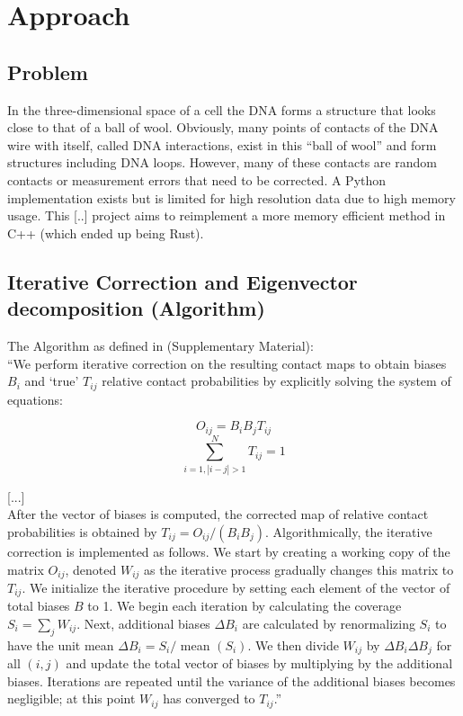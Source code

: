 \chapter{Approach}\label{chap:approach}



\section{Problem}\label{sec:problem}

In the three-dimensional space of a cell the DNA forms a structure that looks
close to that of a ball of wool. Obviously, many points of contacts of the DNA
wire with itself, called DNA interactions, exist in this ``ball of wool'' and
form structures including DNA loops. However, many of these contacts are
random contacts or measurement errors that need to be corrected. A Python
implementation exists but is limited for high resolution data due to high
memory usage. This [..] project aims to reimplement a more memory efficient
method in C++ (which ended up being Rust).



\section{Iterative Correction and Eigenvector decomposition (Algorithm)}\label{sec:ICE}

The Algorithm as defined in \cite{imakaev2012iterative} (Supplementary Material): \\
``We perform iterative correction on the resulting contact maps to obtain
biases $B_i$ and `true' $T_{ij}$ relative contact probabilities by explicitly
solving the system of equations:

$$ O_{ij} = B_i B_j T_{ij} $$
$$ \sum^N_{i=1, |i-j|>1} T_{ij} = 1$$

[...] \\
After the vector of biases is computed, the corrected map of relative
contact probabilities is obtained by $T_{ij} = O_{ij} / (B_i B_j)$.
Algorithmically, the iterative correction is implemented as follows. We start
by creating a working copy of the matrix $O_{ij}$, denoted $W_{ij}$ as the
iterative process gradually changes this matrix to $T_{ij}$. We initialize the
iterative procedure by setting each element of the vector of total biases $B$
to 1. We begin each iteration by calculating the coverage $S_i = \sum_j
W_{ij}$. Next, additional biases $\Delta B_i$ are calculated by renormalizing
$S_i$ to have the unit mean $\Delta B_i = S_i /$ mean $(S_i)$. We then divide
$W_{ij}$ by $\Delta B_i \Delta B_j$ for all $(i, j)$ and update the total
vector of biases by multiplying by the additional biases. Iterations are
repeated until the variance of the additional biases becomes negligible; at
this point $W_{ij}$ has converged to $T_{ij}$.'' \\

